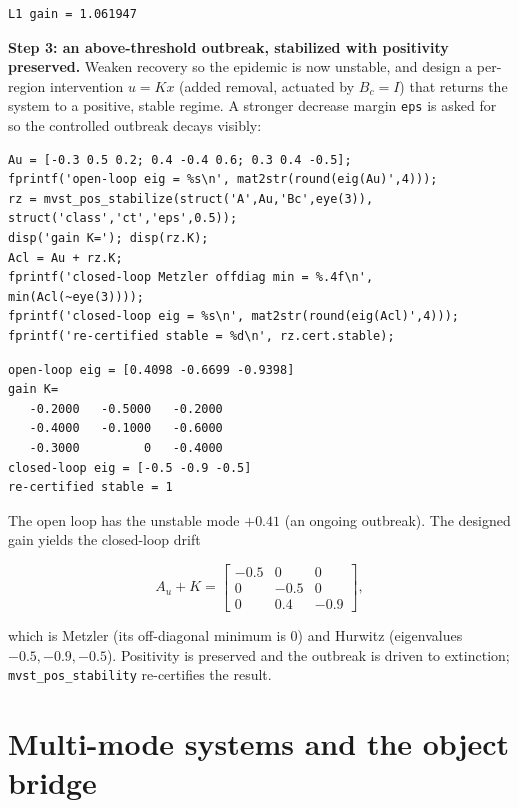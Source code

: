 \documentclass[11pt,oneside]{report}
\newcommand{\code}[1]{\texttt{#1}}
\begin{document}
\begin{lstlisting}[style=outputstyle]
L1 gain = 1.061947
\end{lstlisting}

\textbf{Step 3: an above-threshold outbreak, stabilized with positivity preserved.}
Weaken recovery so the epidemic is now unstable, and design a per-region
intervention \(u = K x\) (added removal, actuated by \(B_c = I\)) that returns the
system to a positive, stable regime. A stronger decrease margin \code{eps} is asked
for so the controlled outbreak decays visibly:

\begin{lstlisting}[style=matlabstyle]
Au = [-0.3 0.5 0.2; 0.4 -0.4 0.6; 0.3 0.4 -0.5];
fprintf('open-loop eig = %s\n', mat2str(round(eig(Au)',4)));
rz = mvst_pos_stabilize(struct('A',Au,'Bc',eye(3)), struct('class','ct','eps',0.5));
disp('gain K='); disp(rz.K);
Acl = Au + rz.K;
fprintf('closed-loop Metzler offdiag min = %.4f\n', min(Acl(~eye(3))));
fprintf('closed-loop eig = %s\n', mat2str(round(eig(Acl)',4)));
fprintf('re-certified stable = %d\n', rz.cert.stable);
\end{lstlisting}

\begin{lstlisting}[style=outputstyle]
open-loop eig = [0.4098 -0.6699 -0.9398]
gain K=
   -0.2000   -0.5000   -0.2000
   -0.4000   -0.1000   -0.6000
   -0.3000         0   -0.4000
closed-loop eig = [-0.5 -0.9 -0.5]
re-certified stable = 1
\end{lstlisting}

The open loop has the unstable mode \(+0.41\) (an ongoing outbreak). The designed
gain yields the closed-loop drift

\[
A_u + K = \begin{bmatrix} -0.5 & 0 & 0 \\ 0 & -0.5 & 0 \\ 0 & 0.4 & -0.9 \end{bmatrix},
\]

which is Metzler (its off-diagonal minimum is \(0\)) and Hurwitz (eigenvalues
\(-0.5, -0.9, -0.5\)). Positivity is preserved and the outbreak is driven to
extinction; \code{mvst\_pos\_stability} re-certifies the result.

\hypertarget{multi-mode-systems-and-the-object-bridge}{%
\section{Multi-mode systems and the object bridge}\label{multi-mode-systems-and-the-object-bridge}}
\end{document}

